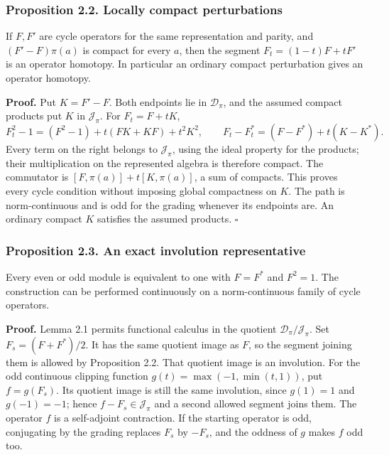 \documentclass[
  11pt,
]{article}
\begin{document}
\subsubsection{Proposition 2.2. Locally compact
perturbations}\label{proposition-2.2.-locally-compact-perturbations}

If \(F,F'\) are cycle operators for the same representation and parity,
and \((F'-F)\pi(a)\) is compact for every \(a\), then the segment
\(F_t=(1-t)F+tF'\) is an operator homotopy. In particular an ordinary
compact perturbation gives an operator homotopy.

\textbf{Proof.} Put \(K=F'-F\). Both endpoints lie in
\(\mathcal D_\pi\), and the assumed compact products put \(K\) in
\(\mathcal J_\pi\). For \(F_t=F+tK\), \[
F_t^2-1=(F^2-1)+t(FK+KF)+t^2K^2,
\qquad
F_t-F_t^*=(F-F^*)+t(K-K^*).
\] Every term on the right belongs to \(\mathcal J_\pi\), using the
ideal property for the products; their multiplication on the represented
algebra is therefore compact. The commutator is
\([F,\pi(a)]+t[K,\pi(a)]\), a sum of compacts. This proves every cycle
condition without imposing global compactness on \(K\). The path is
norm-continuous and is odd for the grading whenever its endpoints are.
An ordinary compact \(K\) satisfies the assumed products. \(\square\)

\subsubsection{Proposition 2.3. An exact involution
representative}\label{proposition-2.3.-an-exact-involution-representative}

Every even or odd module is equivalent to one with \(F=F^*\) and
\(F^2=1\). The construction can be performed continuously on a
norm-continuous family of cycle operators.

\textbf{Proof.} Lemma 2.1 permits functional calculus in the quotient
\(\mathcal D_\pi/\mathcal J_\pi\). Set \(F_s=(F+F^*)/2\). It has the
same quotient image as \(F\), so the segment joining them is allowed by
Proposition 2.2. That quotient image is an involution. For the odd
continuous clipping function \(g(t)=\max(-1,\min(t,1))\), put
\(f=g(F_s)\). Its quotient image is still the same involution, since
\(g(1)=1\) and \(g(-1)=-1\); hence \(f-F_s\in\mathcal J_\pi\) and a
second allowed segment joins them. The operator \(f\) is a self-adjoint
contraction. If the starting operator is odd, conjugating by the grading
replaces \(F_s\) by \(-F_s\), and the oddness of \(g\) makes \(f\) odd
too.
\end{document}
